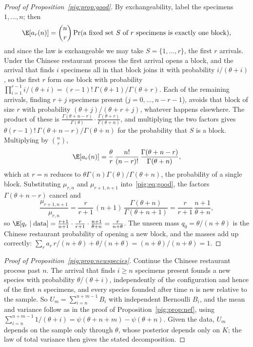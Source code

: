\begin{proof}[Proof of Proposition~\ref{pig:prop:good}]
By exchangeability, label the specimens $1,\dots,n$; then
\[
\E[a_r(n)]=\binom{n}{r}\Pr(\text{a fixed set } S \text{ of } r \text{ specimens is exactly one block}),
\]
and since the law is exchangeable we may take $S=\{1,\dots,r\}$, the first $r$ arrivals. Under the Chinese restaurant process the first arrival opens a block, and the arrival that finds $i$ specimens all in that block joins it with probability $i/(\theta+i)$, so the first $r$ form one block with probability $\prod_{i=1}^{r-1}i/(\theta+i)=(r-1)!\,\Gamma(\theta+1)/\Gamma(\theta+r)$. Each of the remaining arrivals, finding $r+j$ specimens present ($j=0,\dots,n-r-1$), avoids that block of size $r$ with probability $(\theta+j)/(\theta+r+j)$, whatever happens elsewhere. The product of these is $\frac{\Gamma(\theta+n-r)}{\Gamma(\theta)}\cdot\frac{\Gamma(\theta+r)}{\Gamma(\theta+n)}$, and multiplying the two factors gives $\theta(r-1)!\,\Gamma(\theta+n-r)/\Gamma(\theta+n)$ for the probability that $S$ is a block. Multiplying by $\binom nr$,
\[
\E[a_r(n)]=\frac{\theta}{r}\,\frac{n!}{(n-r)!}\,\frac{\Gamma(\theta+n-r)}{\Gamma(\theta+n)},
\]
which at $r=n$ reduces to $\theta\Gamma(n)\Gamma(\theta)/\Gamma(\theta+n)$, the probability of a single block. Substituting $\mu_{r,n}$ and $\mu_{r+1,n+1}$ into~\eqref{pig:eq:good}, the factors $\Gamma(\theta+n-r)$ cancel and
\[
\frac{\mu_{r+1,n+1}}{\mu_{r,n}}=\frac{r}{r+1}\,(n+1)\,\frac{\Gamma(\theta+n)}{\Gamma(\theta+n+1)}=\frac{r}{r+1}\,\frac{n+1}{\theta+n},
\]
so $\E[q_r\mid\text{data}]=\frac{r+1}{n+1}\cdot\frac{r}{r+1}\cdot\frac{n+1}{\theta+n}=\frac{r}{n+\theta}$. The unseen mass $q_0=\theta/(n+\theta)$ is the Chinese restaurant probability of opening a new block, and the masses add up correctly: $\sum_r a_r\,r/(n+\theta)+\theta/(n+\theta)=(n+\theta)/(n+\theta)=1$.
\end{proof}

\begin{proof}[Proof of Proposition~\ref{pig:prop:newspecies}]
Continue the Chinese restaurant process past $n$. The arrival that finds $i\ge n$ specimens present founds a new species with probability $\theta/(\theta+i)$, independently of the configuration and hence of the first $n$ specimens, and every species founded after time $n$ is new relative to the sample. So $U_m=\sum_{i=n}^{n+m-1}B_i$ with independent Bernoulli $B_i$, and the mean and variance follow as in the proof of Proposition~\ref{pig:prop:nef}, using $\sum_{i=n}^{n+m-1}1/(\theta+i)=\psi(\theta+n+m)-\psi(\theta+n)$. Given the data, $U_m$ depends on the sample only through $\theta$, whose posterior depends only on $K$; the law of total variance then gives the stated decomposition.
\end{proof}


